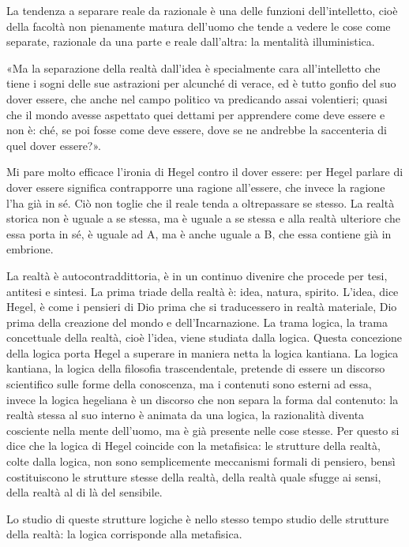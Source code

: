 \documentclass[a4paper,12pt,oneside,openany]{book}%
\begin{document}
La tendenza a separare reale da razionale è una delle funzioni dell’intelletto, cioè della facoltà non pienamente matura dell’uomo che tende a vedere le cose come separate, razionale da una parte e reale dall’altra: la mentalità illuministica.

«Ma la separazione della realtà dall’idea è specialmente cara all’intelletto che tiene i sogni delle sue astrazioni per alcunché di verace, ed è tutto gonfio del suo dover essere, che anche nel campo politico va predicando assai volentieri; quasi che il mondo avesse aspettato quei dettami per apprendere come deve essere e non è: ché, se poi fosse come deve essere, dove se ne andrebbe la saccenteria di quel dover essere?».

Mi pare molto efficace l’ironia di Hegel contro il dover essere: per Hegel parlare di dover essere significa contrapporre una ragione all’essere, che invece la ragione l’ha già in sé. Ciò non toglie che il reale tenda a oltrepassare se stesso. La realtà storica non è uguale a se stessa, ma è uguale a se stessa e alla realtà ulteriore che essa porta in sé, è uguale ad A, ma è anche uguale a B, che essa contiene già in embrione.

La realtà è autocontraddittoria, è in un continuo divenire che procede per tesi, antitesi e sintesi. La prima triade della realtà è: idea, natura, spirito. L’idea, dice Hegel, è come i pensieri di Dio prima che si traducessero in realtà materiale, Dio prima della creazione del mondo e dell’Incarnazione. La trama logica, la trama concettuale della realtà, cioè l’idea, viene studiata dalla logica. Questa concezione della logica porta Hegel a superare in maniera netta la logica kantiana. La logica kantiana, la logica della filosofia trascendentale, pretende di essere un discorso scientifico sulle forme della conoscenza, ma i contenuti sono esterni ad essa, invece la logica hegeliana è un discorso che non separa la forma dal contenuto: la realtà stessa al suo interno è animata da una logica, la razionalità diventa cosciente nella mente dell’uomo, ma è già presente nelle cose stesse. Per questo si dice che la logica di Hegel coincide con la metafisica: le strutture della realtà, colte dalla logica, non sono semplicemente meccanismi formali di pensiero, bensì costituiscono le strutture stesse della realtà, della realtà quale sfugge ai sensi, della realtà al di là del sensibile.

Lo studio di queste strutture logiche è nello stesso tempo studio delle strutture della realtà: la logica corrisponde alla metafisica.
\end{document}
